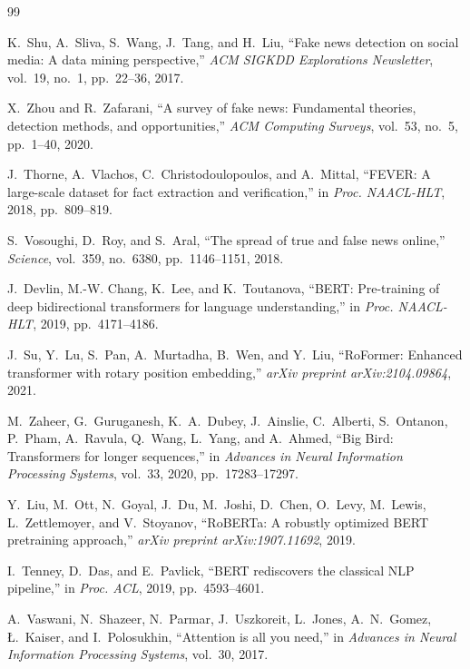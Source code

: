 \documentclass[conference]{IEEEtran}
\begin{document}

\begin{thebibliography}{99}

K.~Shu, A.~Sliva, S.~Wang, J.~Tang, and H.~Liu, ``Fake news detection on social media: A data mining perspective,'' \textit{ACM SIGKDD Explorations Newsletter}, vol.~19, no.~1, pp.~22--36, 2017.

X.~Zhou and R.~Zafarani, ``A survey of fake news: Fundamental theories, detection methods, and opportunities,'' \textit{ACM Computing Surveys}, vol.~53, no.~5, pp.~1--40, 2020.

J.~Thorne, A.~Vlachos, C.~Christodoulopoulos, and A.~Mittal, ``FEVER: A large-scale dataset for fact extraction and verification,'' in \textit{Proc. NAACL-HLT}, 2018, pp.~809--819.

S.~Vosoughi, D.~Roy, and S.~Aral, ``The spread of true and false news online,'' \textit{Science}, vol.~359, no.~6380, pp.~1146--1151, 2018.

J.~Devlin, M.-W. Chang, K.~Lee, and K.~Toutanova, ``BERT: Pre-training of deep bidirectional transformers for language understanding,'' in \textit{Proc. NAACL-HLT}, 2019, pp.~4171--4186.

J.~Su, Y.~Lu, S.~Pan, A.~Murtadha, B.~Wen, and Y.~Liu, ``RoFormer: Enhanced transformer with rotary position embedding,'' \textit{arXiv preprint arXiv:2104.09864}, 2021.

M.~Zaheer, G.~Guruganesh, K.~A.~Dubey, J.~Ainslie, C.~Alberti, S.~Ontanon, P.~Pham, A.~Ravula, Q.~Wang, L.~Yang, and A.~Ahmed, ``Big Bird: Transformers for longer sequences,'' in \textit{Advances in Neural Information Processing Systems}, vol.~33, 2020, pp.~17283--17297.

Y.~Liu, M.~Ott, N.~Goyal, J.~Du, M.~Joshi, D.~Chen, O.~Levy, M.~Lewis, L.~Zettlemoyer, and V.~Stoyanov, ``RoBERTa: A robustly optimized BERT pretraining approach,'' \textit{arXiv preprint arXiv:1907.11692}, 2019.

I.~Tenney, D.~Das, and E.~Pavlick, ``BERT rediscovers the classical NLP pipeline,'' in \textit{Proc. ACL}, 2019, pp.~4593--4601.

A.~Vaswani, N.~Shazeer, N.~Parmar, J.~Uszkoreit, L.~Jones, A.~N.~Gomez, \L.~Kaiser, and I.~Polosukhin, ``Attention is all you need,'' in \textit{Advances in Neural Information Processing Systems}, vol.~30, 2017.


\end{thebibliography}
\end{document}
